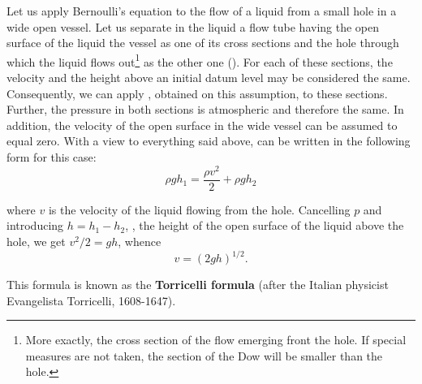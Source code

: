 Let us apply Bernoulli's equation to the flow of a liquid from a small hole in a wide open vessel. Let us separate in the liquid a flow tube having the open surface of the liquid the vessel as one of its cross sections and the hole through which the liquid flows out\footnote{More exactly, the cross section of the flow emerging front the hole. If special measures are not taken, the section of the Dow will be smaller than the hole.} as the other one (). For each of these sections, the velocity and the height above an initial datum level may be considered the same. Consequently, we can apply , obtained on this assumption, to these sections. Further, the pressure in both sections is atmospheric and therefore the same. In addition, the velocity of the open surface in the wide vessel can be assumed to equal zero. With a view to everything said above,  can be written in the following form for this case:
\begin{equation*}
	\rho gh_1 = \frac{\rho v^2}{2} + \rho gh_2
\end{equation*}

\noindent
where $v$ is the velocity of the liquid flowing from the hole. Cancelling $p$ and introducing $h=h_1-h_2$, \ie, the height of the open surface of the liquid above the hole, we get $v^2/2=gh$, whence
\begin{equation}\label{eq:9_6}
	v = (2gh)^{1/2}.
\end{equation}

\noindent
This formula is known as the \textbf{Torricelli formula}  (after the Italian physicist Evangelista Torricelli, 1608-1647).

